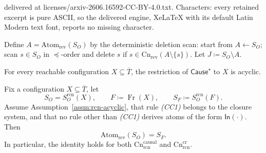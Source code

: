 \documentclass[10pt,a4paper]{amsart}
\DeclareMathOperator{\Fr}{Fr}
\newcommand{\Atom}{\mathrm{Atom}}
\newcommand{\Cn}{\mathrm{Cn}}
\begin{document}
delivered at licenses/arxiv-2606.16592-CC-BY-4.0.txt. Characters: every retained excerpt is pure ASCII, so the delivered engine, XeLaTeX with its default Latin Modern text font, reports no missing character.
\begin{definition}
\label{def:core}
Define \(A=\Atom_{\mathrm{rev}}(S_O)\) by the deterministic deletion scan:
start from \(A\leftarrow S_O\); scan \(s\in S_O\) in \(\preceq\)-order and delete \(s\) if
\(s\in \Cn_{\mathrm{rev}}(A\setminus\{s\})\).
Let \(J\coloneqq S_O\setminus A\).
\end{definition}

\begin{assumption}
\label{assm:rcn-acyclic}
For every reachable configuration \(X\subseteq\overline{T}\), the restriction of
\(\mathsf{Cause}^\star\) to \(X\) is acyclic.
\end{assumption}

\begin{proposition}
\label{prop:frontier-core-downward}
Fix a configuration \(X\subseteq\overline{T}\), let
\[
S_O=S_O^{\mathrm{rcn}}(X), \qquad F\coloneqq \Fr(X), \qquad S_F\coloneqq S_O^{\mathrm{rcn}}(F).
\]
Assume Assumption~\ref{assm:rcn-acyclic}, that rule \emph{(CC1)} belongs to the closure system,
and that no rule other than \emph{(CC1)} derives atoms of the form \(\mathsf{In}(\cdot)\).
Then
\[
\Atom_{\mathrm{rev}}(S_O)=S_F.
\]
In particular, the identity holds for both \(\Cn^{\mathrm{causal}}_{\mathrm{rcn}}\) and
\(\Cn^{\mathrm{cr}}_{\mathrm{rcn}}\).
\end{proposition}
\end{document}
